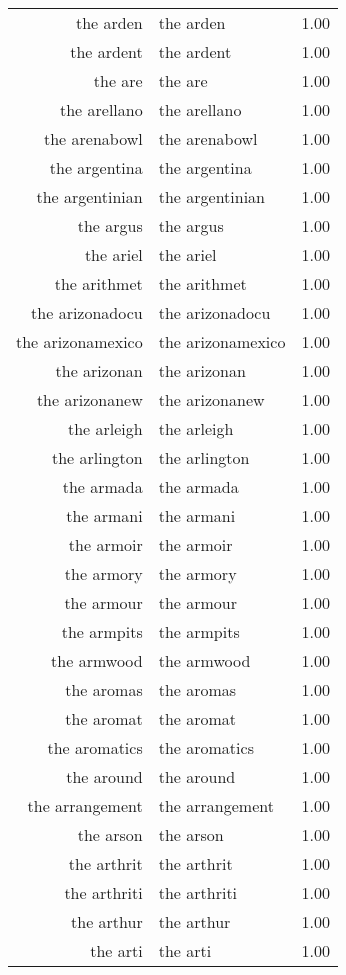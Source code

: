 \begin{table}[ht]
\begin{tabular}{rlr}
  the arden & the arden & 1.00 \\ 
  the ardent & the ardent & 1.00 \\ 
  the are & the are & 1.00 \\ 
  the arellano & the arellano & 1.00 \\ 
  the arenabowl & the arenabowl & 1.00 \\ 
  the argentina & the argentina & 1.00 \\ 
  the argentinian & the argentinian & 1.00 \\ 
  the argus & the argus & 1.00 \\ 
  the ariel & the ariel & 1.00 \\ 
  the arithmet & the arithmet & 1.00 \\ 
  the arizonadocu & the arizonadocu & 1.00 \\ 
  the arizonamexico & the arizonamexico & 1.00 \\ 
  the arizonan & the arizonan & 1.00 \\ 
  the arizonanew & the arizonanew & 1.00 \\ 
  the arleigh & the arleigh & 1.00 \\ 
  the arlington & the arlington & 1.00 \\ 
  the armada & the armada & 1.00 \\ 
  the armani & the armani & 1.00 \\ 
  the armoir & the armoir & 1.00 \\ 
  the armory & the armory & 1.00 \\ 
  the armour & the armour & 1.00 \\ 
  the armpits & the armpits & 1.00 \\ 
  the armwood & the armwood & 1.00 \\ 
  the aromas & the aromas & 1.00 \\ 
  the aromat & the aromat & 1.00 \\ 
  the aromatics & the aromatics & 1.00 \\ 
  the around & the around & 1.00 \\ 
  the arrangement & the arrangement & 1.00 \\ 
  the arson & the arson & 1.00 \\ 
  the arthrit & the arthrit & 1.00 \\ 
  the arthriti & the arthriti & 1.00 \\ 
  the arthur & the arthur & 1.00 \\ 
  the arti & the arti & 1.00 \\ 

\end{tabular}
\end{table}
